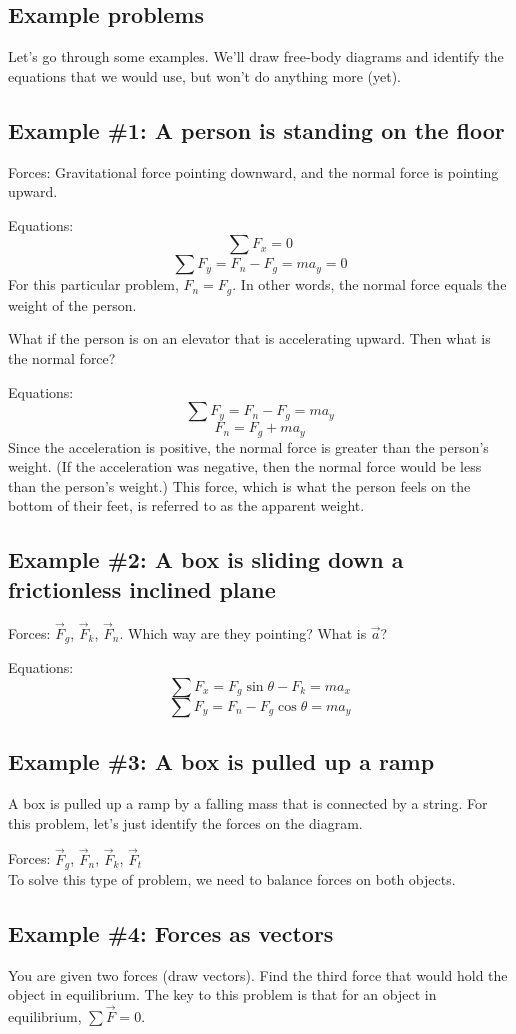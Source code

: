 \subsection{Example problems}
Let's go through some examples. We'll draw free-body diagrams and identify the equations that we would use, but won't do anything more (yet).

\subsection*{Example \#1: A person is standing on the floor}
Forces: Gravitational force pointing downward, and the normal force is pointing upward.

Equations:
$$\sum F_x=0$$
$$\sum F_y=F_n-F_g=ma_y=0$$
For this particular problem, $F_n=F_g$. In other words, the normal force equals the weight of the person.

What if the person is on an elevator that is accelerating upward. Then what is the normal force?

Equations:
$$\sum F_y=F_n-F_g=ma_y$$
$$F_n = F_g+ma_y$$
Since the acceleration is positive, the normal force is greater than the person's weight. (If the acceleration was negative, then the normal force would be less than the person's weight.) This force, which is what the person feels on the bottom of their feet, is referred to as the apparent weight.

\subsection{Example \#2: A box is sliding down a frictionless inclined plane}
Forces: $\vec{F}_g$, $\vec{F}_k$, $\vec{F}_n$. Which way are they pointing? What is $\vec{a}$?

Equations:
$$\sum F_x=F_g\sin\theta-F_k = ma_x$$
$$\sum F_y=F_n-F_g\cos\theta = ma_y$$

\subsection{Example \#3: A box is pulled up a ramp}
A box is pulled up a ramp by a falling mass that is connected by a string. For this problem, let's just identify the forces on the diagram.

Forces: $\vec{F}_g$, $\vec{F}_n$, $\vec{F}_k$, $\vec{F}_t$\\
To solve this type of problem, we need to balance forces on both objects.

\subsection{Example \#4: Forces as vectors}
You are given two forces (draw vectors). Find the third force that would hold the object in equilibrium. The key to this problem is that for an object in equilibrium, $\sum \vec F=0$.

\clearpage
